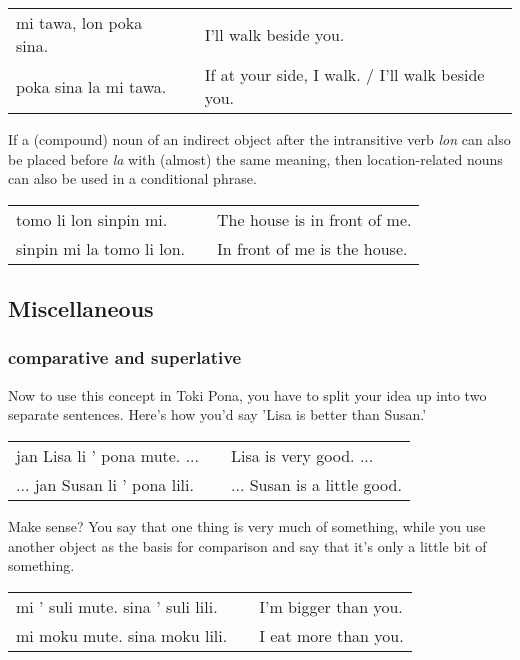 \begin{supertabular}{p{5,5cm}|ll}
    mi tawa, lon poka sina. &  & I'll walk beside you.                            \\
    poka sina la mi tawa.   &  & If at your side, I walk. / I'll walk beside you. \\
\end{supertabular}

If a (compound) noun of an indirect object after the intransitive verb \textit{lon} can also be placed before \textit{la} with (almost) the same meaning, then location-related nouns can also be used in a conditional phrase.

\begin{supertabular}{p{5,5cm}|ll}
    tomo li lon sinpin mi.    &  & The house is in front of me. \\
    sinpin mi la tomo li lon. &  & In front of me is the house. \\
\end{supertabular}

\subsection*{Miscellaneous}

\subsubsection*{comparative and superlative}
Now to use this concept in Toki Pona, you have to split your idea up into two separate sentences.
Here's how you'd say 'Lisa is better than Susan.'

\begin{supertabular}{p{5,5cm}|ll}
    jan Lisa li ' pona mute. ...  &  & Lisa is very good. ...      \\
    ... jan Susan li ' pona lili. &  & ... Susan is a little good. \\
\end{supertabular}

Make sense?
You say that one thing is very much of something, while you use another object as the basis for comparison and say that it's only a little bit of something.

\begin{supertabular}{p{5,5cm}|ll}
    mi ' suli mute. sina ' suli lili. &  & I'm bigger than you. \\
    mi moku mute. sina moku lili.     &  & I eat more than you. \\
\end{supertabular}

